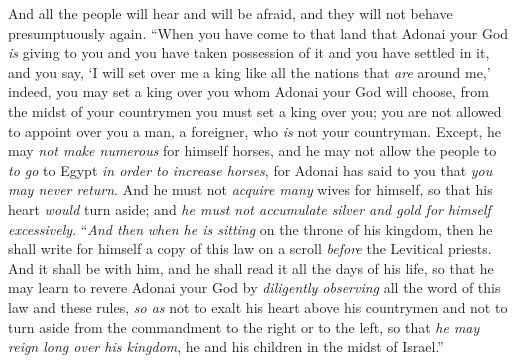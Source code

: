 \begin{biblechapter}
\verse And all the people will hear and will be afraid, and they will not behave presumptuously again.
\verse “When you have come to that land that Adonai your God \textit{is} giving to you and you have taken possession of it and you have settled in it, and you say, ‘I will set over me a king like all the nations that \textit{are} around me,’
\verse indeed, you may set a king over you whom Adonai your God will choose, from the midst of your countrymen you must set a king over you; you are not allowed to appoint over you a man, a foreigner, who \textit{is} not your countryman.
\verse Except, he may \textit{not make numerous} for himself horses, and he may not allow the people to \textit{to go} to Egypt \textit{in order to increase horses}, for Adonai has said to you that \textit{you may never return}.
\verse And he must not \textit{acquire many} wives for himself, so that his heart \textit{would} turn aside; and \textit{he must not accumulate silver and gold for himself excessively}.
\verse “\textit{And then} \textit{when he is sitting} on the throne of his kingdom, then he shall write for himself a copy of this law on a scroll \textit{before} the Levitical priests.
\verse And it shall be with him, and he shall read it all the days of his life, so that he may learn to revere Adonai your God by \textit{diligently observing} all the word of this law and these rules,
\verse \textit{so as} not to exalt his heart above his countrymen and not to turn aside from the commandment to the right or to the left, so that \textit{he may reign long over his kingdom}, he and his children in the midst of Israel.”
\end{biblechapter}

